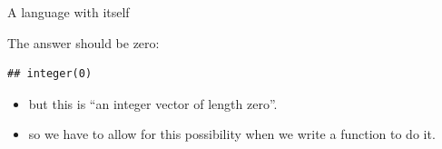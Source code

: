 \documentclass[ignorenonframetext,]{beamer}
\newenvironment{Shaded}{\begin{snugshade}}{\end{snugshade}}
\newcommand{\DataTypeTok}[1]{\textcolor[rgb]{0.13,0.29,0.53}{#1}}
\newcommand{\KeywordTok}[1]{\textcolor[rgb]{0.13,0.29,0.53}{\textbf{#1}}}
\newcommand{\NormalTok}[1]{#1}
\newcommand{\OperatorTok}[1]{\textcolor[rgb]{0.81,0.36,0.00}{\textbf{#1}}}
\newcommand{\StringTok}[1]{\textcolor[rgb]{0.31,0.60,0.02}{#1}}
\providecommand{\tightlist}{%
  \setlength{\itemsep}{0pt}\setlength{\parskip}{0pt}}
\begin{document}
\begin{frame}[fragile]{A language with itself}
\protect\hypertarget{a-language-with-itself}{}

The answer should be zero:

\begin{Shaded}
\end{Shaded}

\begin{verbatim}
## integer(0)
\end{verbatim}

\begin{itemize}
\tightlist
\item
  but this is ``an integer vector of length zero''.
\item
  so we have to allow for this possibility when we write a function to
  do it.
\end{itemize}

\end{frame}
\end{document}
